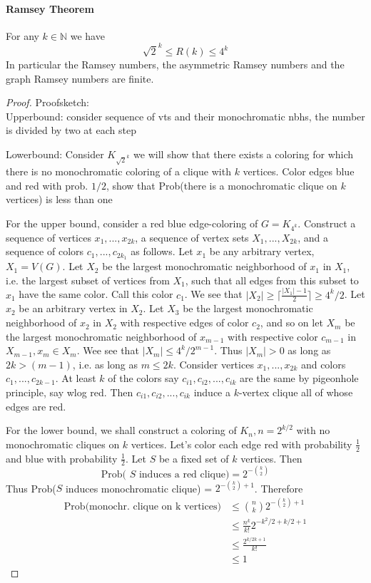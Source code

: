 \paragraph{Ramsey Theorem} For any $k \in \mathbb{N}$ we have 
$$ \sqrt{2}^k \leq R(k) \leq 4^k $$ 
In particular the Ramsey numbers, the asymmetric Ramsey numbers and the graph 
Ramsey numbers are finite.
\begin{proof}
    Proofsketch: \\
    Upperbound: consider sequence of vts and their monochromatic nbhs, the 
    number is divided by two at each step 

    \smallskip
    Lowerbound: Consider $K_{\sqrt{2}^k}$ we will show that there
    exists a coloring for which there is no monochromatic coloring of a clique 
    with $k$ vertices. Color edges blue 
    and red with prob.  $1/2$, show that Prob(there is a 
    monochromatic clique on $k$ vertices) is less than one 

    \bigskip
    For the upper bound, consider a red blue  edge-coloring of $G = K_{4^k}$.
    Construct a sequence of vertices $x_1,...,x_{2k}$, a 
    sequence of vertex sets $X_1,...,X_{2k}$, and a sequence of colors
    $c_1,...,c_{2k_1}$ as follows. Let $x_1$ be any arbitrary vertex, $X_1 =
    V(G)$. Let $X_2$ be the largest monochromatic neighborhood of $x_1$ in 
    $X_1$, i.e. the largest subset of vertices from $X_1$, such that all edges 
    from this subset to $x_1$ have the same color. Call this color $c_1$. 
    We see that $|X_2| \geq \lceil\frac{|X_1|-1}{2}\rceil \geq 4^k /2$. Let
    $x_2$ be an arbitrary vertex in $X_2$. Let $X_3$ be the largest 
    monochromatic neighborhood of $x_2$ in $X_2$ with respective edges of 
    color $c_2$, and so on let $X_m$ be the largest monochromatic neighborhood
    of $x_{m-1}$ with respective color $c_{m-1}$ in $X_{m-1}, x_m \in X_m$.
    Wee see that $|X_m| \leq 4^k / 2^{m-1}$. Thus $|X_m| > 0$ as long as 
    $2k > (m-1)$, i.e. as long as $m \leq 2k$. Consider vertices 
    $x_1,...,x_{2k}$ and colors $c_1,...,c_{2k-1}$. At least $k$ of the colors
    say $c_{i1},c_{i2},...,c_{ik}$ are the same by pigeonhole principle, say
    wlog red. Then $c_{i1},c_{i2},...,c_{ik}$ induce a $k$-vertex clique all
    of whose edges are red.

    \bigskip
    For the lower bound, we shall construct a coloring of $K_n, n = 2^{k/2}$ 
    with no monochromatic cliques on $k$ vertices. Let's color each edge red 
    with probability $\frac{1}{2}$ and blue with probability $\frac{1}{2}$.
    Let $S$ be a fixed set of $k$ vertices. Then 
    $$ \text{Prob( } S \text{ induces a red clique)} = 2^{-\binom{k}{2}} $$
    Thus Prob($S$ induces monochromatic clique) = $ 2^{-\binom{k}{2} + 1}$.
    Therefore
    \begin{align*}
        \text{Prob(monochr. clique on k vertices)} 
        &\leq \binom{n}{k} 2^{-\binom{k}{2} +1} \\
        &\leq \frac{n^k}{k!} 2^{-k^2/2 + k/2+1} \\
        &\leq \frac{2^{k/2k+1}}{k!} \\
        &\leq 1
    \end{align*}




\end{proof}
